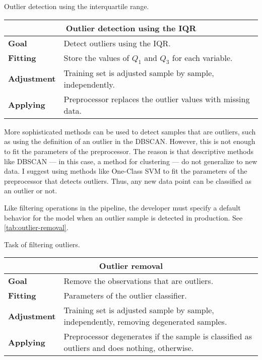 \begin{tablebox}[label=tab:iqr-outlier]{Outlier detection using the interquartile range.}
  \centering
  \begin{tabular}{lp{6cm}}
    \toprule
    \multicolumn{2}{c}{\textbf{Outlier detection using the IQR}} \\
    \midrule
    \textbf{Goal} &
      Detect outliers using the IQR. \\
    \textbf{Fitting} &
      Store the values of $Q_1$ and $Q_3$ for each variable. \\
    \textbf{Adjustment} &
      Training set is adjusted sample by sample, independently. \\
    \textbf{Applying} &
      Preprocessor replaces the outlier values with missing data. \\
    \bottomrule
  \end{tabular}
\end{tablebox}

More sophisticated methods can be used to detect samples that are outliers, such as using
the definition of an outlier in the DBSCAN.  However, this is not
enough to fit the parameters of the preprocessor.  The reason is that descriptive methods
like DBSCAN  --- in this case, a method for clustering --- do not generalize to new data.
I suggest using methods like One-Class SVM to fit the
parameters of the preprocessor that detects outliers.  Thus, any new data point can
be classified as an outlier or not.

Like filtering operations in the pipeline, the developer must specify a default behavior
for the model when an outlier sample is detected in production.  See
\cref{tab:outlier-removal}.

\begin{tablebox}[label=tab:outlier-removal]{Task of filtering outliers.}
  \centering
  \begin{tabular}{lp{6cm}}
    \toprule
    \multicolumn{2}{c}{\textbf{Outlier removal}} \\
    \midrule
    \textbf{Goal} &
      Remove the observations that are outliers. \\
    \textbf{Fitting} &
      Parameters of the outlier classifier. \\
    \textbf{Adjustment} &
      Training set is adjusted sample by sample, independently, removing
      degenerated samples. \\
    \textbf{Applying} &
      Preprocessor degenerates if the sample is classified as outliers and does
      nothing, otherwise. \\
    \bottomrule
  \end{tabular}
\end{tablebox}

